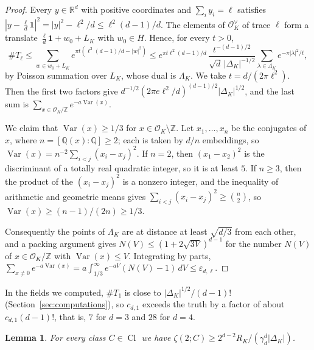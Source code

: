 \documentclass[11pt]{amsart}
\newtheorem{lemma}[theorem]{Lemma}
\theoremstyle{definition}
\numberwithin{equation}{section}
\DeclareMathOperator{\Var}{Var}
\DeclareMathOperator{\Cl}{Cl}
\newcommand{\OK}{\mathcal{O}_K}
\newcommand{\OKd}{\mathcal{O}_K^{\vee}}
\newcommand{\Q}{\mathbb{Q}}
\newcommand{\Z}{\mathbb{Z}}
\newcommand{\R}{\mathbb{R}}
\newcommand{\LamK}{\Lambda_K}
\newcommand{\one}{\mathbf{1}}
\begin{document}
\begin{proof}
Every $y\in\R^d$ with positive coordinates and $\sum_iy_i=\ell$ satisfies
$|y-\tfrac{\ell}{d}\one|^2=|y|^2-\ell^2/d\le\ell^2(d-1)/d$.  The elements of $\OKd$ of trace $\ell$ form
a translate $\tfrac{\ell}{d}\one+w_0+L_K$ with $w_0\in H$.  Hence, for every $t>0$,
\[
  \#T_\ell\le\sum_{w\in w_0+L_K}e^{\pi t(\ell^2(d-1)/d-|w|^2)}
  \le e^{\pi t\ell^2(d-1)/d}\,\frac{t^{-(d-1)/2}}{\sqrt d\,|\Delta_K|^{-1/2}}\sum_{\lambda\in\LamK}e^{-\pi|\lambda|^2/t},
\]
by Poisson summation over $L_K$, whose dual is $\LamK$.  We take $t=d/(2\pi\ell^2)$.  Then the first two
factors give $d^{-1/2}(2\pi e\ell^2/d)^{(d-1)/2}|\Delta_K|^{1/2}$, and the last sum is
$\sum_{x\in\OK/\Z}e^{-a\Var(x)}$.

We claim that $\Var(x)\ge1/3$ for $x\in\OK\setminus\Z$.  Let $x_1,\dots,x_n$ be the conjugates of
$x$, where $n=[\Q(x):\Q]\ge2$; each is taken by $d/n$ embeddings, so
$\Var(x)=n^{-2}\sum_{i<j}(x_i-x_j)^2$.  If $n=2$, then $(x_1-x_2)^2$ is the discriminant of a totally
real quadratic integer, so it is at least $5$.  If $n\ge3$, then the product of the $(x_i-x_j)^2$ is
a nonzero integer, and the inequality of arithmetic and geometric means gives
$\sum_{i<j}(x_i-x_j)^2\ge\binom n2$, so $\Var(x)\ge(n-1)/(2n)\ge1/3$.

Consequently the points of $\LamK$ are at distance at least $\sqrt{d/3}$ from each other, and a
packing argument gives $N(V)\le(1+2\sqrt{3V})^{d-1}$ for the number $N(V)$ of $x\in\OK/\Z$ with
$\Var(x)\le V$.  Integrating by parts,
$\sum_{x\ne0}e^{-a\Var(x)}=a\int_{1/3}^\infty e^{-aV}(N(V)-1)\,dV\le\varepsilon_{d,\ell}$.
\end{proof}

In the fields we computed, $\#T_1$ is close to $|\Delta_K|^{1/2}/(d-1)!$ (Section~\ref{sec:computations}),
so $c_{d,1}$ exceeds the truth by a factor of about $c_{d,1}(d-1)!$, that is, $7$ for $d=3$ and $28$
for $d=4$.

\begin{lemma}\label{lem:reg}
For every class $C\in\Cl$ we have $\zeta(2;C)\ge2^{d-2}R_K/(\gamma_d^d|\Delta_K|)$.
\end{lemma}
\end{document}
